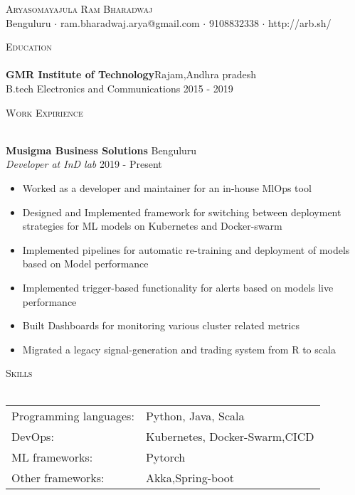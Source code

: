 \documentclass[a4paper]{article}
\newcommand{\lineunder} {
    \vspace*{-8pt} \\
    \hspace*{-18pt} \hrulefill \\
}
\newcommand{\header} [1] {
    {\hspace*{-18pt}\vspace*{6pt} \textsc{#1}}
    \vspace*{-6pt} \lineunder
}
\begin{document}
\vspace*{-40pt}

    

\vspace*{-10pt}
\begin{center}
	{\Huge \scshape {Aryasomayajula Ram Bharadwaj}}\\
	Benguluru $\cdot$ ram.bharadwaj.arya@gmail.com $\cdot$ 9108832338 $\cdot$ http://arb.sh/\\
\end{center}

\header{Education}
\textbf{GMR Institute of Technology}\hfill Rajam,Andhra pradesh\\
B.tech Electronics and Communications  \hfill 2015 - 2019\\
\vspace{2mm}

\header{Work Expirience}
\vspace{1mm}

\textbf{Musigma Business Solutions} \hfill Benguluru\\
\textit{Developer at InD lab} \hfill 2019 - Present\\
\vspace{-1mm}
\begin{itemize} \itemsep 1pt
	\item Worked as a developer and maintainer for an in-house MlOps tool
	\item Designed and Implemented framework for switching between deployment strategies for ML models on Kubernetes and Docker-swarm
	\item Implemented pipelines for automatic re-training and deployment of models based on Model performance
	\item Implemented trigger-based functionality for alerts based on model\textquotesingle{}s live performance
	\item Built Dashboards for monitoring various cluster related metrics
	\item Migrated a legacy signal-generation and trading system from R to scala
\end{itemize}

\header{Skills}
\begin{tabular}{ l l }
	Programming languages: & Python, Java, Scala           \\
	DevOps:                & Kubernetes, Docker-Swarm,CICD \\
	ML frameworks:         & Pytorch                       \\
	Other frameworks:      & Akka,Spring-boot              \\
\end{tabular}
\vspace{2mm}
\end{document}
